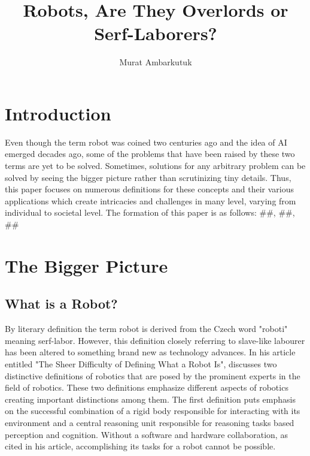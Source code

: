 \documentclass[man]{apa6}
\title{Robots, Are They Overlords or Serf-Laborers?}
\author{Murat Ambarkutuk}
\affiliation{English Language Institute, University of Delaware \\ murata@udel.
edu}
\begin{document}
\maketitle
\section{Introduction}
Even though the term robot was coined two centuries ago and the idea of AI emerged decades ago, some of the problems that have been raised by these two terms are yet to be solved.
Sometimes, solutions for any arbitrary problem can be solved by seeing the bigger picture rather than scrutinizing tiny details.
Thus, this paper focuses on numerous definitions for these concepts and their various applications which create intricacies and challenges in many level, varying from individual to societal level.
The formation of this paper is as follows: \#\#, \#\#, \#\#

\section{The Bigger Picture}
\subsection{What is a Robot?}
\par

By literary definition the term robot is derived from the Czech word "roboti" meaning serf-labor. 
However, this definition closely referring to slave-like labourer has been altered to something brand new as technology advances.
In his article entitled "The Sheer Difficulty of Defining What a Robot Is",  discusses two distinctive definitions of robotics that are posed by the prominent experts in the field of robotics.
These two definitions emphasize different aspects of robotics creating important distinctions among them.
The first definition puts emphasis on the successful combination of a rigid body responsible for interacting with its environment and a central reasoning unit responsible for reasoning tasks based perception and cognition.
Without a software and hardware collaboration, as  cited in his article, accomplishing its tasks for a robot cannot be possible.
\end{document}
